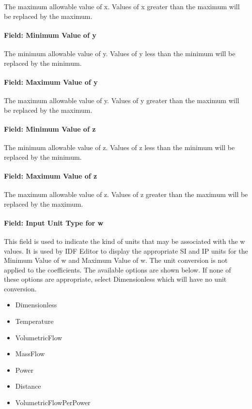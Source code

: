 The maximum allowable value of x. Values of x greater than the maximum will be replaced by the maximum.

\paragraph{Field: Minimum Value of y}\label{field-minimum-value-of-y}

The minimum allowable value of y. Values of y less than the minimum will be replaced by the minimum.

\paragraph{Field: Maximum Value of y}\label{field-maximum-value-of-y}

The maximum allowable value of y. Values of y greater than the maximum will be replaced by the maximum.

\paragraph{Field: Minimum Value of z}\label{field-minimum-value-of-z}

The minimum allowable value of z. Values of z less than the minimum will be replaced by the minimum.

\paragraph{Field: Maximum Value of z}\label{field-maximum-value-of-z}

The maximum allowable value of z. Values of z greater than the maximum will be replaced by the maximum.

\paragraph{Field: Input Unit Type for w}\label{field-input-unit-type-for-w}

This field is used to indicate the kind of units that may be associated with the w values. It is used by IDF Editor to display the appropriate SI and IP units for the Minimum Value of w and Maximum Value of w. The unit conversion is not applied to the coefficients. The available options are shown below. If none of these options are appropriate, select Dimensionless which will have no unit conversion.

\begin{itemize}
\item
  Dimensionless
\item
  Temperature
\item
  VolumetricFlow
\item
  MassFlow
\item
  Power
\item
  Distance
\item
  VolumetricFlowPerPower
\end{itemize}

